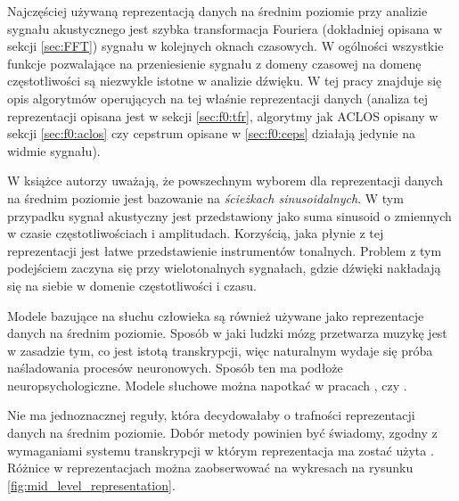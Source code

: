 \documentclass[12pt,a4paper,twoside]{mwart}
\begin{document}
Najczęściej używaną reprezentacją danych na średnim poziomie przy analizie sygnału akustycznego jest szybka transformacja Fouriera (dokładniej opisana w sekcji \ref{sec:FFT}) sygnału w kolejnych oknach czasowych. W ogólności wszystkie funkcje pozwalające na przeniesienie sygnału z domeny czasowej na domenę częstotliwości są niezwykle istotne w analizie dźwięku. W tej pracy znajduje się opis algorytmów operujących na tej właśnie reprezentacji danych (analiza tej reprezentacji opisana jest w sekcji \ref{sec:f0:tfr}, algorytmy jak ACLOS opisany w sekcji \ref{sec:f0:aclos} czy cepstrum opisane w \ref{sec:f0:ceps} działają jedynie na widmie sygnału).

W książce \cite{Transcription:Zatorre:AuditoryCortex} autorzy uważają, że powszechnym wyborem dla reprezentacji danych na średnim poziomie jest bazowanie na \textit{ścieżkach sinusoidalnych}. W tym przypadku sygnał akustyczny jest przedstawiony jako suma sinusoid o zmiennych w czasie częstotliwościach i amplitudach. Korzyścią, jaka płynie z tej reprezentacji jest łatwe przedstawienie instrumentów tonalnych. Problem z tym podejściem zaczyna się przy wielotonalnych sygnałach, gdzie dźwięki nakładają się na siebie w domenie częstotliwości i czasu. 

Modele bazujące na słuchu człowieka są również używane jako reprezentacje danych na średnim poziomie. Sposób w jaki ludzki mózg przetwarza muzykę jest w zasadzie tym, co jest istotą transkrypcji, więc naturalnym wydaje się próba naśladowania procesów neuronowych. Sposób ten ma podłoże neuropsychologiczne. Modele słuchowe można napotkać w pracach \cite{Transcription:Karjalainen:MultipitchAnalysisModel}, \cite{Transcription:Zatorre:AuditoryCortex} czy \cite{Transcription:Meddis:VirtualPitchOnNerve}.

Nie ma jednoznacznej reguły, która decydowałaby o trafności reprezentacji danych na średnim poziomie. Dobór metody powinien być świadomy, zgodny z wymaganiami systemu transkrypcji w którym reprezentacja ma zostać użyta \cite[13-15]{Transcription:Zatorre:AuditoryCortex}. Różnice w reprezentacjach można zaobserwować na wykresach na rysunku \ref{fig:mid_level_representation}. 
\end{document}
